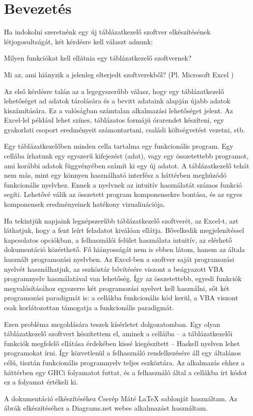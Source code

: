 \chapter{Bevezetés} %
\label{ch:intro}

Ha indokolni szeretnénk egy új táblázatkezelő szoftver elkészítésének létjogosultságát, két kérdésre kell választ adnunk:
\begin{compactenum}
	\item Milyen funkciókat kell ellátnia egy táblázatkezelő szoftvernek?
	\item Mi az, ami hiányzik a jelenleg elterjedt szoftverekből? (Pl. Microsoft Excel \cite{excel})
\end{compactenum}

Az első kérdésre talán az a legegyszerűbb válasz, hogy egy táblázatkezelő lehetőséget ad adatok tárolására és a bevitt adataink alapján újabb adatok kiszámítására. Ez a valóságban számtalan alkalmazási lehetőséget jelent. Az Excel-lel például lehet színes, táblázatos formájú órarendet készíteni, egy gyakorlati csoport eredményeit számontartani, családi költségvetést vezetni, stb. 

Egy táblázatkezelőben minden cella tartalma egy funkcionális program. Egy cellába írhatunk egy egyszerű kifejezést (adat), vagy egy összetettebb programot, ami korábbi adatok függvényében számít ki egy új adatot. A táblázatkezelő tehát nem más, mint egy könnyen használható interfész a háttérben meghúzódó funkcionális nyelvhez. Ennek a nyelvnek az intuitív használatát számos funkció segíti. Lehetővé válik az összetett program komponensekre bontása, és az egyes komponensek eredményeinek hatékony vizualiuációja.

Ha tekintjük napjaink legnépszerűbb táblázatkezelő szoftverét, az Excel-t, azt láthatjuk, hogy a fent leírt feladatot kiválóan ellátja. Bővelkedik megjelenítéssel kapcsolatos opciókban, a felhasználói felület használata intuitív, az elérhető dokumentáció közérthető. Fő hiányosságát nem is ebben látom, hanem az általa használt programozási nyelvben. Az Excel-ben a szoftver saját programozási nyelvét használhatjuk, az eszköztár bővítésére viszont a beágyazott VBA \cite{vba_excel} programnyelv használatával van lehetőség. Így az összetettebb, egyedi funkciók megvalósításához egyszerre két programozási nyelvet kell használni, sőt két programozási paradigmát is: a cellákba funkcionális kód kerül, a VBA viszont csak korlátozottan támogatja a funkcionális paradigmát. 

Ezen probléma megoldására teszek kísérletet dolgozatomban. Egy olyan táblázatkezelő szoftvert készítettem el, aminek a celláiba -- a táblázatkezelői funkciók megfelelő ellátása érdekében kissé kiegészített -- Haskell \cite{haskell_report} nyelven lehet programokat írni. Így közvetlenül a felhasználó rendelkezésére áll egy általános célú, tisztán funkcionális programnyelv teljes eszköztára. Az alkalmazás ehhez a háttérben egy GHCi folyamatot futtat, és a felhasználó által a cellákba írt kódot ez a folyamat értékeli ki.

A dokumentáció elkészítéséhez Cserép Máté LaTeX sablonját \cite{mcserep} használtam. Az ábrák elkészítéséhez a Diagrams.net \cite{diagramsnet} webes alkalmazást használtam.	